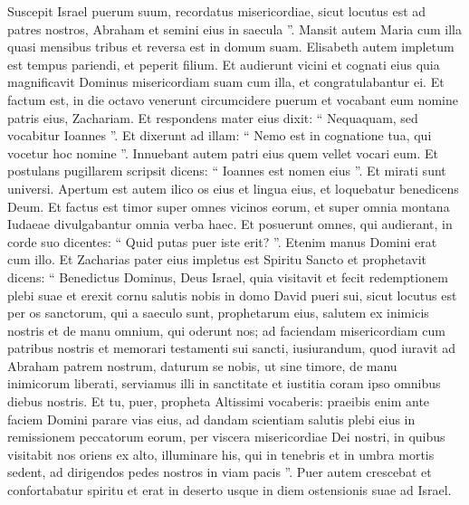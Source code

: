 \begin{biblechapter}
 \verse Suscepit Israel puerum suum,
 recordatus misericordiae,
 \verse sicut locutus est ad patres nostros,
 Abraham et semini eius in saecula ”.
 \verse Mansit autem Maria cum illa quasi mensibus tribus et reversa est in domum suam. 
\verse Elisabeth autem impletum est tempus pariendi, et peperit filium. 
 \verse Et audierunt vicini et cognati eius quia magnificavit Dominus misericordiam suam cum illa, et congratulabantur ei. 
\verse Et factum est, in die octavo venerunt circumcidere puerum et vocabant eum nomine patris eius, Zachariam. 
 \verse Et respondens mater eius dixit: “ Nequaquam, sed vocabitur Ioannes ”. 
\verse Et dixerunt ad illam: “ Nemo est in cognatione tua, qui vocetur hoc nomine ”. 
\verse Innuebant autem patri eius quem vellet vocari eum. 
\verse Et postulans pugillarem scripsit dicens: “ Ioannes est nomen eius ”. Et mirati sunt universi. 
 \verse Apertum est autem ilico os eius et lingua eius, et loquebatur benedicens Deum. 
\verse Et factus est timor super omnes vicinos eorum, et super omnia montana Iudaeae divulgabantur omnia verba haec. 
\verse Et posuerunt omnes, qui audierant, in corde suo dicentes: “ Quid putas puer iste erit? ”. Etenim manus Domini erat cum illo.
 \verse Et Zacharias pater eius impletus est Spiritu Sancto et prophetavit dicens:
 \verse “ Benedictus Dominus, Deus Israel,
 quia visitavit et fecit redemptionem plebi suae
 \verse et erexit cornu salutis nobis
 in domo David pueri sui,
 \verse sicut locutus est per os sanctorum,
 qui a saeculo sunt, prophetarum eius,
 \verse salutem ex inimicis nostris
 et de manu omnium, qui oderunt nos;
 \verse ad faciendam misericordiam cum patribus nostris
 et memorari testamenti sui sancti,
 \verse iusiurandum, quod iuravit ad Abraham patrem nostrum,
 daturum se nobis,
 \verse ut sine timore, de manu inimicorum liberati,
 serviamus illi
 \verse in sanctitate et iustitia coram ipso
 omnibus diebus nostris.
 \verse Et tu, puer, propheta Altissimi vocaberis:
 praeibis enim ante faciem Domini parare vias eius,
 \verse ad dandam scientiam salutis plebi eius
 in remissionem peccatorum eorum,
 \verse per viscera misericordiae Dei nostri,
 in quibus visitabit nos oriens ex alto,
 \verse illuminare his, qui in tenebris et in umbra mortis sedent,
 ad dirigendos pedes nostros in viam pacis ”.
 \verse Puer autem crescebat et confortabatur spiritu et erat in deserto usque in diem ostensionis suae ad Israel.
 

\end{biblechapter}
